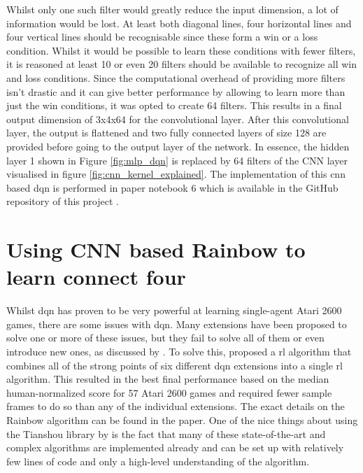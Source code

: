Whilst only one such filter would greatly reduce the input dimension, a lot of information would be lost.
At least both diagonal lines, four horizontal lines and four vertical lines should be recognisable since these form a win or a loss condition. 
Whilst it would be possible to learn these conditions with fewer filters, it is reasoned at least 10 or even 20 filters should be available to recognize all win and loss conditions.
Since the computational overhead of providing more filters isn't drastic and it can give better performance by allowing to learn more than just the win conditions, it was opted to create 64 filters.
This results in a final output dimension of 3x4x64 for the convolutional layer.
After this convolutional layer, the output is flattened and two fully connected layers of size 128 are provided before going to the output layer of the network.
In essence, the hidden layer 1 shown in Figure \ref{fig:mlp_dqn} is replaced by 64 filters of the CNN layer visualised in figure \ref{fig:cnn_kernel_explained}.
The implementation of this \gls{cnn} based \gls{dqn} is performed in paper notebook 6 which is available in the GitHub repository of this project \citep{github_project}.



\section{Using CNN based Rainbow to learn connect four}
\label{sec:connect_four_rl-rainbow}

Whilst \gls{dqn} has proven to be very powerful at learning single-agent Atari 2600 games, there are some issues with \gls{dqn}.
Many extensions have been proposed to solve one or more of these issues, but they fail to solve all of them or even introduce new ones, as discussed by \citet{rainbow}.
To solve this, \citet{rainbow} proposed a \gls{rl} algorithm that combines all of the strong points of six different \gls{dqn} extensions into a single \gls{rl} algorithm.
This resulted in the best final performance based on the median human-normalized score for 57 Atari 2600 games and required fewer sample frames to do so than any of the individual extensions.
The exact details on the Rainbow algorithm can be found in the \citet{rainbow} paper.
One of the nice things about using the Tianshou library by \citet{tianshou} is the fact that many of these state-of-the-art and complex algorithms are implemented already and can be set up with relatively few lines of code and only a high-level understanding of the algorithm.

